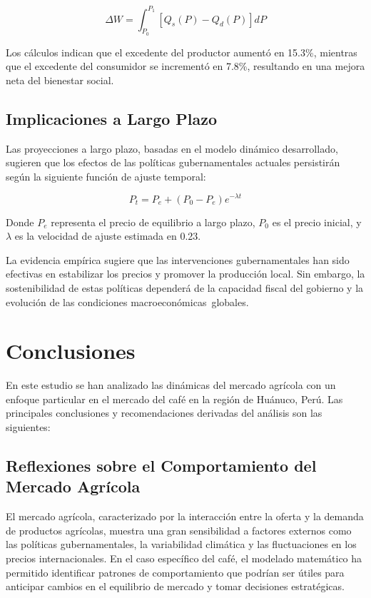 \documentclass[12pt, a4paper]{article}
\begin{document}
\begin{equation}
\Delta W = \int_{P_0}^{P_1} [Q_s(P) - Q_d(P)]dP
\end{equation}

Los cálculos indican que el excedente del productor aumentó en 15.3\%, mientras que el excedente del consumidor se incrementó en 7.8\%, resultando en una mejora neta del bienestar social.

\subsection{Implicaciones a Largo Plazo}

Las proyecciones a largo plazo, basadas en el modelo dinámico desarrollado, sugieren que los efectos de las políticas gubernamentales actuales persistirán según la siguiente función de ajuste temporal:

\begin{equation}
P_t = P_e + (P_0 - P_e)e^{-\lambda t}
\end{equation}

Donde $P_e$ representa el precio de equilibrio a largo plazo, $P_0$ es el precio inicial, y $\lambda$ es la velocidad de ajuste estimada en 0.23.

La evidencia empírica sugiere que las intervenciones gubernamentales han sido efectivas en estabilizar los precios y promover la producción local. Sin embargo, la sostenibilidad de estas políticas dependerá de la capacidad fiscal del gobierno y la evolución de las condiciones macroeconómicas globales.
\section{Conclusiones}

En este estudio se han analizado las dinámicas del mercado agrícola con un enfoque particular en el mercado del café en la región de Huánuco, Perú. Las principales conclusiones y recomendaciones derivadas del análisis son las siguientes:

\subsection{Reflexiones sobre el Comportamiento del Mercado Agrícola}

El mercado agrícola, caracterizado por la interacción entre la oferta y la demanda de productos agrícolas, muestra una gran sensibilidad a factores externos como las políticas gubernamentales, la variabilidad climática y las fluctuaciones en los precios internacionales. En el caso específico del café, el modelado matemático ha permitido identificar patrones de comportamiento que podrían ser útiles para anticipar cambios en el equilibrio de mercado y tomar decisiones estratégicas.
\end{document}
